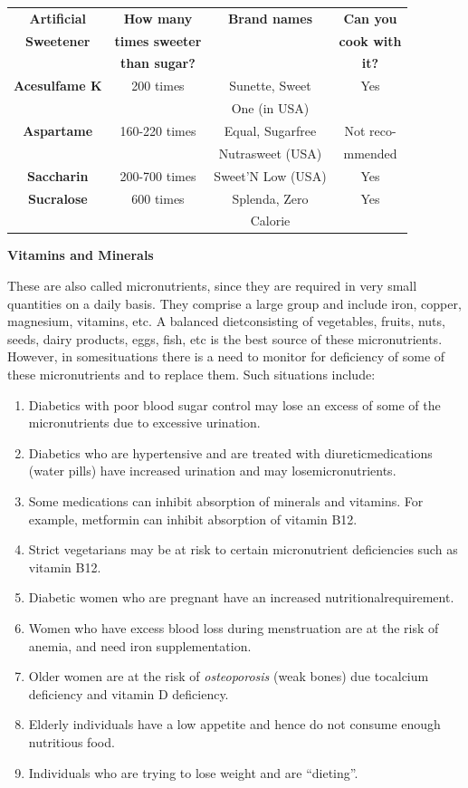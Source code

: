 {
\addtolength{\tabcolsep}{-5pt}
\begin{longtable}{|c|c|c|c|}
\hline
\textbf{Artificial} & \textbf{How many} & \textbf{Brand names} & \textbf{Can you}\\
\textbf{Sweetener} & \textbf{times sweeter} &  & \textbf{cook with}\\
 & \textbf{than sugar?} &  & \textbf{it?}\\
\hline
\textbf{Acesulfame K} & 200 times & Sunette, Sweet & Yes\\
 &  & One (in USA) & \\
\hline
\textbf{Aspartame} & 160-220 times & Equal, Sugarfree & Not reco-\\
 &  & Nutrasweet (USA) & mmended\\
\hline
\textbf{Saccharin} & 200-700 times & Sweet’N Low (USA) & Yes\\
\hline
\textbf{Sucralose} & 600 times & Splenda, Zero & Yes\\
 &  & Calorie & \\
\hline
\end{longtable}
}\relax

\noindent\textbf{Vitamins and Minerals}

These are also called micronutrients, since they are required in very small quantities on a daily basis. They comprise a large group and include iron, copper, magnesium, vitamins, etc. A balanced diet\break consisting of vegetables, fruits, nuts, seeds, dairy products, eggs, fish, etc is the best source of these micronutrients. However, in some\break situations there is a need to monitor for deficiency of some of these micronutrients and to replace them. Such situations include:

\begin{enumerate}[•]
\itemsep=0pt
\item Diabetics with poor blood sugar control may lose an excess of some of the micronutrients due to excessive urination.
\item Diabetics who are hypertensive and are treated with diuretic\break medications (water pills) have increased urination and may lose\break micronutrients.
\item Some medications can inhibit absorption of minerals and vitamins. For example, metformin can inhibit absorption of vitamin B12.
\item Strict vegetarians may be at risk to certain micronutrient defici\-encies such as vitamin B12.
\item Diabetic women who are pregnant have an increased nutritional\break requirement.
\item Women who have excess blood loss during menstruation are at the risk of anemia, and need iron supplementation.
\item Older women are at the risk of \textit{osteoporosis} (weak bones) due to\break calcium deficiency and vitamin D deficiency.
\item Elderly individuals have a low appetite and hence do not consume enough nutritious food.
\item Individuals who are trying to lose weight and are “dieting”.
\end{enumerate}

